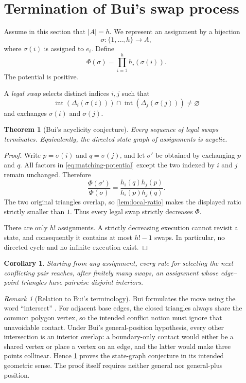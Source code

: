 \documentclass[final,5p,times,twocolumn]{elsarticle}
\newtheorem{theorem}{Theorem}[section]
\newtheorem{corollary}[corollary]{Corollary}
\theoremstyle{definition}
\theoremstyle{remark}
\newtheorem{remark}[remark]{Remark}
\newcommand{\interior}[1]{\operatorname{int}(#1)}
\newcommand{\height}{h}
\newcommand{\Potential}{\Phi}
\begin{document}
\section{Termination of Bui's swap process}
\label{sec:bui}

Assume in this section that $|A|=h$. We represent an assignment by a bijection
\[
\sigma:\{1,\ldots,h\}\longrightarrow A,
\]
where $\sigma(i)$ is assigned to $e_i$. Define
\begin{equation}
\Potential(\sigma)=\prod_{i=1}^{h}\height_i(\sigma(i)).
\label{eq:matching-potential}
\end{equation}
The potential is positive.

A \emph{legal swap} selects distinct indices $i,j$ such that
\[
\interior{\Delta_i(\sigma(i))}
\cap
\interior{\Delta_j(\sigma(j))}
\neq\varnothing
\]
and exchanges $\sigma(i)$ and $\sigma(j)$.

\begin{theorem}[Bui's acyclicity conjecture]
\label{thm:bui}
Every sequence of legal swaps terminates. Equivalently, the directed state graph of assignments is acyclic.
\end{theorem}

\begin{proof}
Write $p=\sigma(i)$ and $q=\sigma(j)$, and let $\sigma'$ be obtained by exchanging $p$ and $q$. All factors in \eqref{eq:matching-potential} except the two indexed by $i$ and $j$ remain unchanged. Therefore
\[
\frac{\Potential(\sigma')}{\Potential(\sigma)}
=
\frac{\height_i(q)\height_j(p)}
{\height_i(p)\height_j(q)}.
\]
The two original triangles overlap, so \cref{lem:local-ratio} makes the displayed ratio strictly smaller than $1$. Thus every legal swap strictly decreases $\Potential$.

There are only $h!$ assignments. A strictly decreasing execution cannot revisit a state, and consequently it contains at most $h!-1$ swaps. In particular, no directed cycle and no infinite execution exist.
\end{proof}

\begin{corollary}
\label{cor:terminal-matching}
Starting from any assignment, every rule for selecting the next conflicting pair reaches, after finitely many swaps, an assignment whose edge--point triangles have pairwise disjoint interiors.
\end{corollary}

\begin{remark}[Relation to Bui's terminology]
\label{rem:bui-intersection}
Bui formulates the move using the word ``intersect'' \cite[Conjecture~8.1]{Bui2025}. For adjacent base edges, the closed triangles always share the common polygon vertex, so the intended conflict notion must ignore that unavoidable contact. Under Bui's general-position hypothesis, every other intersection is an interior overlap: a boundary-only contact would either be a shared vertex or place a vertex on an edge, and the latter would make three points collinear. Hence \cref{thm:bui} proves the state-graph conjecture in its intended geometric sense. The proof itself requires neither general nor general-plus position.
\end{remark}
\end{document}
